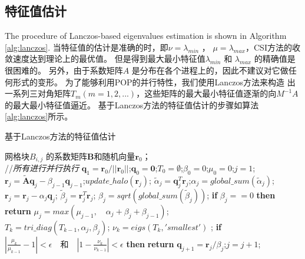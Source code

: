 

\subsection{特征值估计}

The procedure of Lanczos-based eigenvalues estimation is shown in Algorithm \ref{alg:lanczos}.
当特征值的估计是准确的时，即$\nu = \lambda_{min}$ ， $\mu =\lambda_{max}$，CSI方法的收敛速度达到理论上的最优值。 
但是得到最大最小特征值$\lambda_{min}$ 和 $\lambda_{max}$ 的精确值是很困难的。
另外，由于系数矩阵$A$ 是分布在各个进程上的，因此不建议对它做任何形式的变形。  
为了能够利用POP的并行特性，我们使用Lanczos方法来构造 出一系列三对角矩阵$T_m (m=1,2,...)$，这些矩阵的最大最小特征值逐渐的向$M^{-1}A$的最大最小特征值逼近。
基于Lanczos方法的特征值估计的步骤如算法\ref{alg:lanczos}所示。 
\vspace{-10pt}
\begin{algorithm}
\caption{ 基于Lanczos方法的特征值估计}
\label{alg:lanczos}
\begin{algorithmic}[1]
\REQUIRE  网格块$B_{i,j}$ 的系数矩阵$\textbf{B}$和随机向量$\textbf{r}_0$；\\
 //\qquad    \textit{所有进行并行执行}
\STATE $\textbf{q}_1 = \textbf{r}_0/||\textbf{r}_0||$;\quad $\textbf{q}_0=\textbf{0}$;\quad $T_0=\emptyset$;\quad $\beta_0 =0$;\quad  $\mu_0 =0$;\quad $j=1$;
\STATE $\textbf{r}_j=\tilde{\textbf{A}}\textbf{q}_j-\beta_{j-1}\textbf{q}_{j-1}$;\quad $update\_halo(\textbf{r}_j)$;
\STATE $\tilde{\alpha}_j =\textbf{q}_j^T\textbf{r}_j$;\quad $\alpha_j=global\_sum(\tilde{\alpha}_j)$; 
\STATE $\textbf{r}_j=\textbf{r}_j-\alpha_{j}\textbf{q}_{j}$;
\STATE $\tilde{\beta}_j = \textbf{r}_j^T\textbf{r}_j$; \quad $\beta_j=sqrt(global\_sum(\tilde{\beta}_j))$;
\STATE \textbf{if} $\beta_j == 0$ \textbf{then} \textbf{return}
\STATE $\mu_j = max(\mu_{j-1}, \quad \alpha_j+\beta_j+\beta_{j-1})$; \label{lanczos_gersh} \\
\STATE $T_k=tri\_diag(T_{k-1},\alpha_j,\beta_j)$; \quad $\nu_k = eigs(T_k,'smallest')$ ; \label{lanczos_tridiag} 
\STATE \textbf{if} $|\frac{\mu_k}{\mu_{k-1}} -1 |< \epsilon\quad\textbf{和}\quad|1- \frac{\nu_k}{\nu_{k-1}}|< \epsilon$ \textbf{then} \textbf{return}
\STATE $\textbf{q}_{j+1}= \textbf{r}_j/\beta_j$;\quad $j=j+1$;
\ENDWHILE
\end{algorithmic}
\end{algorithm}
\vspace{-10pt}

